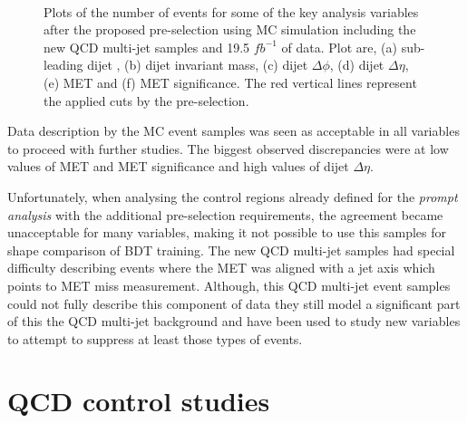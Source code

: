 \begin{figure}[!htb]
 \\
\caption{Plots of the number of events for some of the key analysis variables after the proposed pre-selection using \gls{MC} simulation including the new \gls{QCD} multi-jet samples and 19.5 $fb^{-1}$ of data. Plot are, (a) sub-leading dijet \pt, (b) dijet invariant mass, (c) dijet $\Delta\phi$, (d) dijet $\Delta\eta$, (e) \gls{MET} and (f) \gls{MET} significance. The red vertical lines represent the applied cuts by the pre-selection.}
\label{FIGURE:PreparationParkedDataAnalysis_QCDVBFMET_PreSectionVariables}
\end{figure}

Data description by the \gls{MC} event samples was seen as acceptable in all variables to proceed with further studies. The biggest observed discrepancies were at low values of \gls{MET} and \gls{MET} significance and high values of dijet $\Delta\eta$.

Unfortunately, when analysing the control regions already defined for the \textit{prompt analysis} with the additional pre-selection requirements, the agreement became unacceptable for many variables, making it not possible to use this samples for shape comparison of \gls{BDT} training. The new \gls{QCD} multi-jet samples had special difficulty describing events where the \gls{MET} was aligned with a jet axis which points to \gls{MET} miss measurement. Although, this \gls{QCD} multi-jet event samples could not fully describe this component of data they still model a significant part of this the \gls{QCD} multi-jet background and have been used to study new variables to attempt to suppress at least those types of events. 

\clearpage

\section{QCD control studies}

